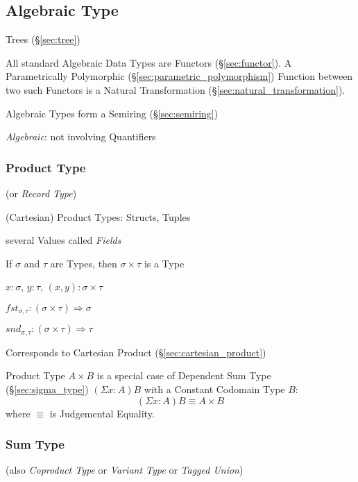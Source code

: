 \subsection{Algebraic Type}\label{sec:algebraic_type}

Trees (\S\ref{sec:tree})

All standard Algebraic Data Types are Functors (\S\ref{sec:functor}).
A Parametrically Polymorphic (\S\ref{sec:parametric_polymorphism})
Function between two such Functors is a Natural Transformation
(\S\ref{sec:natural_transformation}).

Algebraic Types form a Semiring (\S\ref{sec:semiring})

\emph{Algebraic}: not involving Quantifiers %



\subsubsection{Product Type}\label{sec:product_type}

(or \emph{Record Type})

(Cartesian) Product Types: Structs, Tuples

several Values called \emph{Fields}

If $\sigma$ and $\tau$ are Types, then $\sigma \times \tau$ is a Type

$x : \sigma$, $y : \tau$, $(x,y) : \sigma \times \tau$

$fst_{\sigma,\tau} : (\sigma \times \tau) \Rightarrow \sigma$

$snd_{\sigma,\tau} : (\sigma \times \tau) \Rightarrow \tau$

Corresponds to Cartesian Product (\S\ref{sec:cartesian_product})

Product Type $A \times B$ is a special case of Dependent Sum Type
(\S\ref{sec:sigma_type}) $(\Sigma x:A)B$ with a Constant Codomain
Type $B$:
\[
  (\Sigma x:A) B \equiv A \times B
\]
where $\equiv$ is Judgemental Equality.



\subsubsection{Sum Type}\label{sec:sum_type}

(also \emph{Coproduct Type} or \emph{Variant Type} or \emph{Tagged
  Union})

